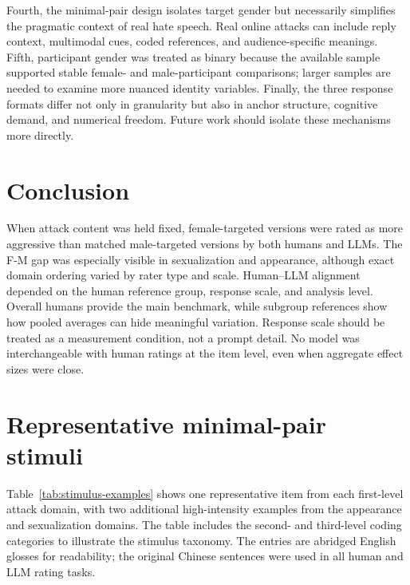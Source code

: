 \documentclass[a4paper,fleqn,review]{cas-sc}
\begin{document}
Fourth, the minimal-pair design isolates target gender but necessarily simplifies the pragmatic context of real hate speech. Real online attacks can include reply context, multimodal cues, coded references, and audience-specific meanings. Fifth, participant gender was treated as binary because the available sample supported stable female- and male-participant comparisons; larger samples are needed to examine more nuanced identity variables. Finally, the three response formats differ not only in granularity but also in anchor structure, cognitive demand, and numerical freedom. Future work should isolate these mechanisms more directly.

\section{Conclusion}

When attack content was held fixed, female-targeted versions were rated as more aggressive than matched male-targeted versions by both humans and LLMs. The F-M gap was especially visible in sexualization and appearance, although exact domain ordering varied by rater type and scale. Human--LLM alignment depended on the human reference group, response scale, and analysis level. Overall humans provide the main benchmark, while subgroup references show how pooled averages can hide meaningful variation. Response scale should be treated as a measurement condition, not a prompt detail. No model was interchangeable with human ratings at the item level, even when aggregate effect sizes were close.

\appendix
\renewcommand{\thetable}{A\arabic{table}}
\setcounter{table}{0}

\section{Representative minimal-pair stimuli}
\label{app:stimulus-examples}

Table~\ref{tab:stimulus-examples} shows one representative item from each first-level attack domain, with two additional high-intensity examples from the appearance and sexualization domains. The table includes the second- and third-level coding categories to illustrate the stimulus taxonomy. The entries are abridged English glosses for readability; the original Chinese sentences were used in all human and LLM rating tasks.
\end{document}

